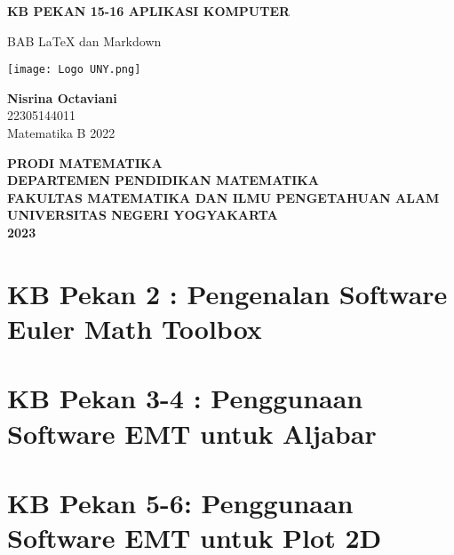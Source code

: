 \documentclass{report}
\begin{document}
\begin{titlepage}
    \begin{center}
        \vspace*{0,2cm}

        \Huge
        \textbf{KB PEKAN 15-16 APLIKASI KOMPUTER}
        
        \vspace{1cm}
        
        \LARGE
        BAB LaTeX dan Markdown  
        
        \vspace{1cm}
        
        \texttt{[image: Logo UNY.png]}

        \vspace{1cm}
        
        \textbf{Nisrina Octaviani}\\
        22305144011\\
        Matematika B 2022
        
        \vspace{2cm}
        
        \Large
        \textbf{PRODI MATEMATIKA}\\
        \textbf{DEPARTEMEN PENDIDIKAN MATEMATIKA}\\
        \textbf{FAKULTAS MATEMATIKA DAN ILMU PENGETAHUAN ALAM}
        \textbf{UNIVERSITAS NEGERI YOGYAKARTA}\\
        \textbf{2023}
        
    \end{center}
\end{titlepage}


\newpage
\tableofcontents

\chapter{KB Pekan 2 : Pengenalan Software Euler Math Toolbox}


\newpage
\chapter{KB Pekan 3-4 : Penggunaan Software EMT untuk Aljabar}


\newpage
\chapter{KB Pekan 5-6: Penggunaan Software EMT untuk Plot 2D}

\end{document}
